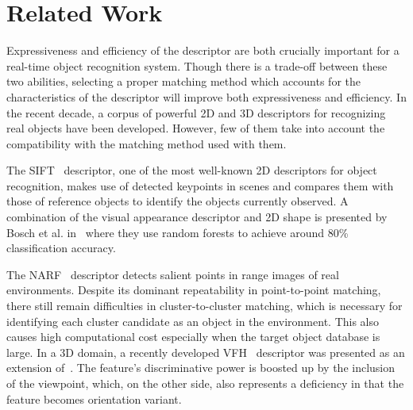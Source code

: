 \documentclass[conference]{sty/IEEEtran}
\begin{document}
\section{Related Work}
\label{sec:rl}
Expressiveness and efficiency of the descriptor are both crucially important for
a real-time object recognition system.  Though there is a trade-off between
these two abilities, selecting a
proper matching method which accounts for the characteristics of the
descriptor will improve both expressiveness and efficiency. 
In the recent decade, a corpus of powerful 2D and 3D descriptors for
recognizing real objects have been developed. However, few of them take into
account the compatibility with the matching method used with them.

The SIFT~\cite{lowe04distinctive} descriptor, one of the most well-known 2D
descriptors for object recognition, makes use of detected keypoints in
scenes and compares them with those of reference objects to identify the
objects currently observed. A combination of the visual appearance
descriptor and 2D shape is presented by Bosch et al. in~\cite{Bosch07shape}
where they use random forests to achieve around 80\% classification 
accuracy. 

The NARF~\cite{steder10irosws} descriptor detects salient points in range images of
real environments. Despite its dominant
repeatability in point-to-point matching, there still remain difficulties in
cluster-to-cluster matching, which is necessary for identifying each cluster
candidate as an object in the environment. This also causes high computational cost
especially when the target object database is large. In a 3D domain, a recently 
developed VFH~\cite{vfh} descriptor was presented as an extension 
of~\cite{Rusu09ICRA}. The feature's discriminative power is boosted up
by the inclusion of the viewpoint, which, on the other side, also represents
a deficiency in that the feature becomes orientation variant. 
\end{document}
